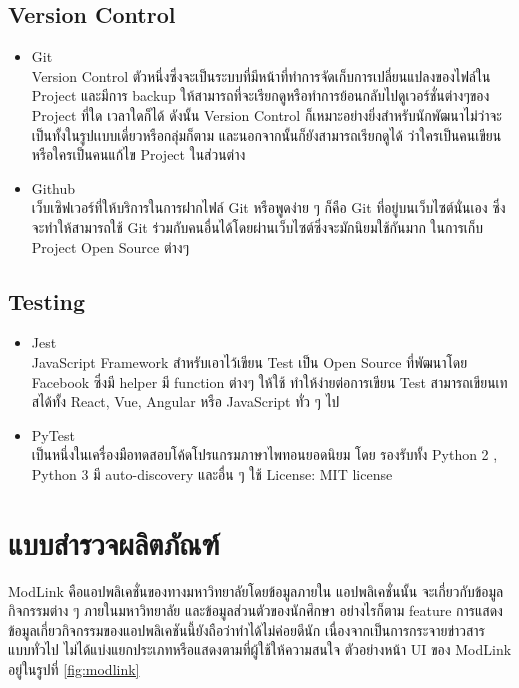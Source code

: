 \documentclass[14pt,oneside,openright,a4paper]{cpe-thai-project}
\begin{document}
  \subsection{Version Control}
    \begin{itemize}
      \item Git \cite{Git} \\
        Version Control ตัวหนึ่งซึ่งจะเป็นระบบที่มีหน้าที่ทำการจัดเก็บการเปลี่ยนแปลงของไฟล์ใน Project และมีการ backup ให้สามารถที่จะเรียกดูหรือทำการย้อนกลับไปดูเวอร์ชั่นต่างๆของ Project ที่ใด เวลาใดก็ได้ ดังนั้น Version Control ก็เหมาะอย่างยิ่งสำหรับนักพัฒนาไม่ว่าจะเป็นทั้งในรูปเเบบเดี่ยวหรือกลุ่มก็ตาม และนอกจากนั้นก็ยังสามารถเรียกดูได้ ว่าใครเป็นคนเขียนหรือใครเป็นคนแก้ไข Project ในส่วนต่าง
      \item Github \\
        เว็บเซิฟเวอร์ที่ให้บริการในการฝากไฟล์ Git หรือพูดง่าย ๆ ก็คือ Git ที่อยู่บนเว็บไซต์นั่นเอง ซึ่งจะทำให้สามารถใช้ Git ร่วมกับคนอื่นได้โดยผ่านเว็บไซต์ซึ่งจะมักนิยมใช้กันมาก ในการเก็บ Project Open Source ต่างๆ
    \end{itemize}

  \subsection{Testing}
    \begin{itemize}
      \item Jest \cite{Jest}\\
        JavaScript Framework สำหรับเอาไว้เขียน Test เป็น Open Source ที่พัฒนาโดย Facebook ซึ่งมี helper มี function ต่างๆ ให้ใช้ ทำให้ง่ายต่อการเขียน Test สามารถเขียนเทสได้ทั้ง React, Vue, Angular หรือ JavaScript ทั่ว ๆ ไป
      \item PyTest \\
        เป็นหนึ่งในเครื่องมือทดสอบโค้ดโปรแกรมภาษาไพทอนยอดนิยม โดย รองรับทั้ง Python 2 , Python 3 มี auto-discovery และอื่น ๆ 
        ใช้ License: MIT license
    \end{itemize}

\section{แบบสำรวจผลิตภัณฑ์}
  ModLink คือแอปพลิเคชั่นของทางมหาวิทยาลัยโดยข้อมูลภายใน แอปพลิเคชั่นนั้น จะเกี่ยวกับข้อมูลกิจกรรมต่าง ๆ ภายในมหาวิทยาลัย และข้อมูลส่วนตัวของนักศึกษา อย่างไรก็ตาม feature การแสดงข้อมูลเกี่ยวกิจกรรมของแอปพลิเคชันนี้ยังถือว่าทำได้ไม่ค่อยดีนัก เนื่องจากเป็นการกระจายข่าวสาร แบบทั่วไป ไม่ได้แบ่งแยกประเภทหรือแสดงตามที่ผู้ใช้ให้ความสนใจ ตัวอย่างหน้า UI ของ ModLink อยู่ในรูปที่ \ref{fig:modlink}
\end{document}
